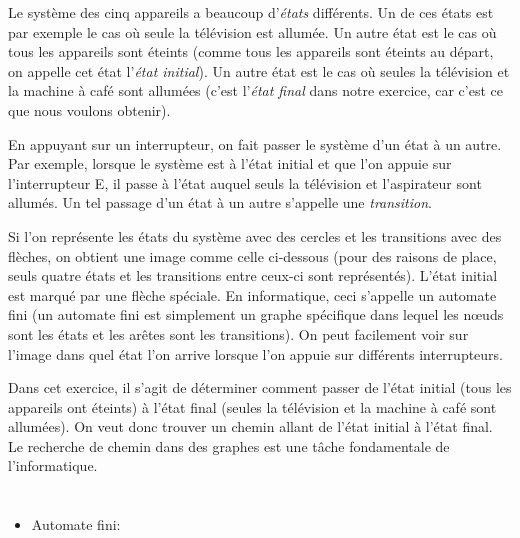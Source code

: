 {{Le système des cinq appareils a beaucoup d’\emph{états} différents. Un de ces états est par exemple le cas où seule la télévision est allumée. Un autre état est le cas où tous les appareils sont éteints (comme tous les appareils sont éteints au départ, on appelle cet état l’\emph{état initial}). Un autre état est le cas où seules la télévision et la machine à café sont allumées (c’est l’\emph{état final} dans notre exercice, car c’est ce que nous voulons obtenir).

En appuyant sur un interrupteur, on fait passer le système d’un état à un autre. Par exemple, lorsque le système est à l’état initial et que l’on appuie sur l’interrupteur E, il passe à l’état auquel seuls la télévision et l’aspirateur sont allumés. Un tel passage d’un état à un autre s’appelle une \emph{transition}.

Si l’on représente les états du système avec des cercles et les transitions avec des flèches, on obtient une image comme celle ci-dessous (pour des raisons de place, seuls quatre états et les transitions entre ceux-ci sont représentés). L’état initial est marqué par une flèche spéciale. En informatique, ceci s’appelle un automate fini (un automate fini est simplement un graphe spécifique dans lequel les nœuds sont les états et les arêtes sont les transitions). On peut facilement voir sur l’image dans quel état l’on arrive lorsque l’on appuie sur différents interrupteurs.

{\centering%
\par}

Dans cet exercice, il s’agit de déterminer comment passer de l’état initial (tous les appareils ont éteints) à l’état final (seules la télévision et la machine à café sont allumées). On veut donc trouver un chemin allant de l’état initial à l’état final. Le recherche de chemin dans des graphes est une tâche fondamentale de l’informatique.



\section*{\BrochureWebsitesAndKeywords}
{\raggedright
\begin{itemize}
  \item Automate fini: \href{https://fr.wikipedia.org/wiki/Automate_fini}{}
\end{itemize}


}}}

